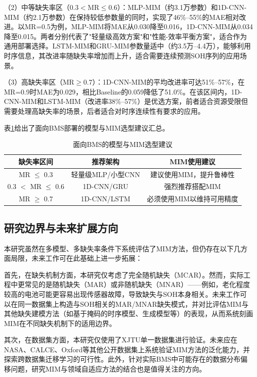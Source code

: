 \documentclass[10pt,a4paper]{ctexart}
\begin{document}
（2）中等缺失率区（0.3$<$MR$\leq$0.6）：MLP-MIM（约3.1万参数）和1D-CNN-MIM（约2.1万参数）在保持较低参数量的同时，实现了46\%--55\%的MAE相对改进。以MR=0.5为例，MLP-MIM将MAE从0.030降至0.016，1D-CNN-MIM从0.034降至0.015。两者分别代表了"轻量级高效方案"和"性能-效率平衡方案"，适合作为通用部署选择。LSTM-MIM和GRU-MIM参数量适中（约3.5万--4.4万），能够利用时序信息，其改进率随缺失率增加而上升，适合需要连续预测SOH序列的应用场景。

（3）高缺失率区（MR$\geq$0.7）：1D-CNN-MIM的平均改进率可达51\%--57\%，在MR=0.9时MAE为0.029，相比Baseline的0.059降低了51.0\%。在该区间内，1D-CNN-MIM和LSTM-MIM（改进率38\%--57\%）是优选方案，前者适合资源受限但需要处理高缺失率的场景，后者适合对时序连续性有要求的应用。

表\ref{tab:model_selection}给出了面向BMS部署的模型与MIM选型建议汇总。

\begin{table}[H]
\centering
\caption{面向BMS的模型与MIM选型建议}
\label{tab:model_selection}
\begin{tabular}{|c|c|c|}
\hline
\textbf{缺失率区间} & \textbf{推荐架构} & \textbf{MIM使用建议} \\
\hline
MR $\leq$ 0.3 & 轻量级MLP/小型CNN & 建议使用MIM，提升鲁棒性 \\
\hline
0.3 $<$ MR $\leq$ 0.6 & 1D-CNN/GRU & 强烈推荐搭配MIM \\
\hline
MR $\geq$ 0.7 & 1D-CNN/LSTM & 必须使用MIM以维持可用精度 \\
\hline
\end{tabular}
\end{table}

\subsection{研究边界与未来扩展方向}

本研究虽然在多模型、多缺失率条件下系统评估了MIM方法，但仍存在以下几方面局限，未来工作可在此基础上进一步拓展：

首先，在缺失机制方面，本研究仅考虑了完全随机缺失（MCAR）。然而，实际工程中更常见的是随机缺失（MAR）或非随机缺失（MNAR）——例如，老化程度较高的电池可能更容易出现传感器故障，导致缺失与SOH本身相关。未来工作可以在同一数据集上构造与SOH相关的MAR/MNAR缺失模式，并对比评估MIM与其他缺失建模方法（如基于掩码的时序模型、生成模型等）的表现，从而系统刻画MIM在不同缺失机制下的适用边界。

其次，在数据集方面，本研究仅使用了XJTU单一数据集进行验证。未来应在NASA、CALCE、Oxford等其他公开数据集上系统验证MIM方法的泛化能力，并探索跨数据集迁移学习的可行性。此外，针对实际BMS中可能存在的数据分布偏移问题，研究MIM与领域自适应方法的结合也是值得关注的方向。
\end{document}
